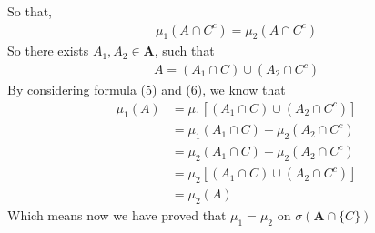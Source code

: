 \documentclass[UTF8]{ctexart}
\theoremstyle{definition}
\begin{document}
So that,
\begin{align}
	\mu_1(A\cap C^{c})=\mu_2(A\cap C^{c})
\end{align}
So there exists $A_1,A_2 \in \bm{A}$, such that
\begin{align*}
	A = (A_1\cap C)\cup(A_2\cap C^{c})
\end{align*}
By considering formula (5) and (6), we know that
\begin{align*}
	\mu_1(A) &= \mu_1[(A_1\cap C)\cup(A_2\cap C^{c})]\\
             &= \mu_1(A_1\cap C)+\mu_2(A_2\cap C^{c})\\
             &= \mu_2(A_1\cap C)+\mu_2(A_2\cap C^{c})\\
             &= \mu_2[(A_1\cap C)\cup(A_2\cap C^{c})]\\
             &= \mu_2(A)
\end{align*}
Which means now we have proved that $\mu_1 = \mu_2$ on $\sigma(\bm{A}\cap\{C\})$
\end{document}
